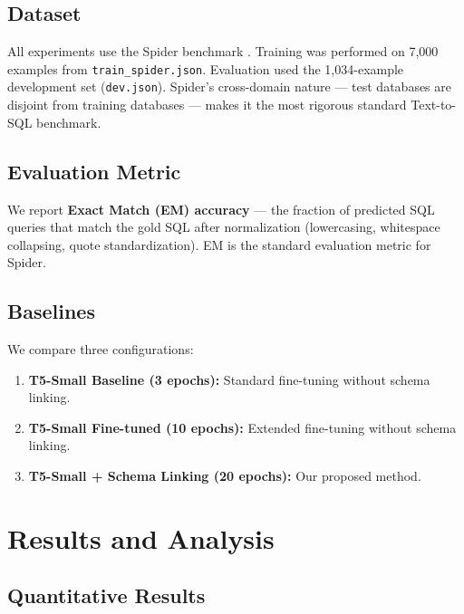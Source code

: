 \documentclass[conference]{IEEEtran}
\begin{document}
\subsection{Dataset}

All experiments use the Spider benchmark \cite{yu2018spider}. Training was performed on 7,000 examples from \texttt{train\_spider.json}. Evaluation used the 1,034-example development set (\texttt{dev.json}). Spider's cross-domain nature — test databases are disjoint from training databases — makes it the most rigorous standard Text-to-SQL benchmark.

\subsection{Evaluation Metric}

We report \textbf{Exact Match (EM) accuracy} — the fraction of predicted SQL queries that match the gold SQL after normalization (lowercasing, whitespace collapsing, quote standardization). EM is the standard evaluation metric for Spider.

\subsection{Baselines}

We compare three configurations:
\begin{enumerate}
    \item \textbf{T5-Small Baseline (3 epochs):} Standard fine-tuning without schema linking.
    \item \textbf{T5-Small Fine-tuned (10 epochs):} Extended fine-tuning without schema linking.
    \item \textbf{T5-Small + Schema Linking (20 epochs):} Our proposed method.
\end{enumerate}

\section{Results and Analysis}

\subsection{Quantitative Results}
\end{document}
